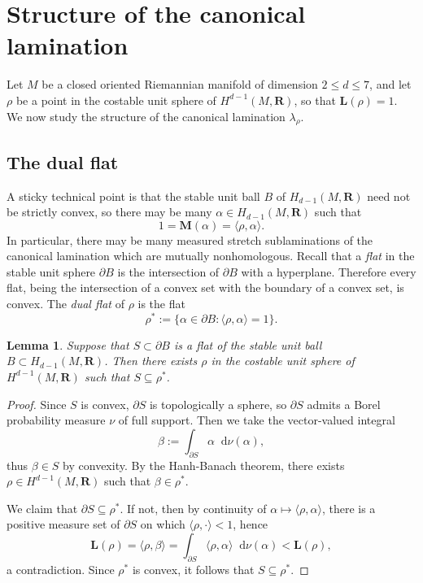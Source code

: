 \documentclass[reqno,11pt]{amsart}
\newcommand{\RR}{\mathbf{R}}
\newcommand*\dif{\mathop{}\!\mathrm{d}}
\newcommand{\Mass}{\mathbf M}
\newcommand{\Comass}{\mathbf L}
\newcommand{\dfn}[1]{\emph{#1}\index{#1}}
\newtheorem{lemma}[theorem]{Lemma}
\theoremstyle{definition}
\numberwithin{equation}{section}
\begin{document}
\section{Structure of the canonical lamination}\label{canonical structure}
Let $M$ be a closed oriented Riemannian manifold of dimension $2 \leq d \leq 7$, and let $\rho$ be a point in the costable unit sphere of $H^{d - 1}(M, \RR)$, so that $\Comass(\rho) = 1$.
We now study the structure of the canonical lamination $\lambda_\rho$.

\subsection{The dual flat}
A sticky technical point is that the stable unit ball $B$ of $H_{d - 1}(M, \RR)$ need not be strictly convex, so there may be many $\alpha \in H_{d - 1}(M, \RR)$ such that
\begin{equation}\label{flats duality}
1 = \Mass(\alpha) = \langle \rho, \alpha\rangle.
\end{equation}
In particular, there may be many measured stretch sublaminations of the canonical lamination which are mutually nonhomologous.
Recall that a \dfn{flat} in the stable unit sphere $\partial B$ is the intersection of $\partial B$ with a hyperplane.
Therefore every flat, being the intersection of a convex set with the boundary of a convex set, is convex.
The \dfn{dual flat} of $\rho$ is the flat
$$\rho^* := \{\alpha \in \partial B: \langle \rho, \alpha\rangle = 1\}.$$

\begin{lemma} \label{flats have dual classes}
Suppose that $S \subset \partial B$ is a flat of the stable unit ball $B \subset H_{d - 1}(M, \RR)$.
Then there exists $\rho$ in the costable unit sphere of $H^{d - 1}(M, \RR)$ such that $S \subseteq \rho^*$.
\end{lemma}
\begin{proof}
Since $S$ is convex, $\partial S$ is topologically a sphere, so $\partial S$ admits a Borel probability measure $\nu$ of full support.
Then we take the vector-valued integral 
$$\beta := \int_{\partial S} \alpha \dif \nu(\alpha),$$
thus $\beta \in S$ by convexity.
By the Hanh-Banach theorem, there exists $\rho \in H^{d - 1}(M, \RR)$ such that $\beta \in \rho^*$.

We claim that $\partial S \subseteq \rho^*$.
If not, then by continuity of $\alpha \mapsto \langle \rho, \alpha\rangle$, there is a positive measure set of $\partial S$ on which $\langle \rho, \cdot\rangle < 1$, hence
$$\Comass(\rho) = \langle \rho, \beta\rangle = \int_{\partial S} \langle \rho, \alpha\rangle \dif \nu(\alpha) < \Comass(\rho),$$
a contradiction.
Since $\rho^*$ is convex, it follows that $S \subseteq \rho^*$.
\end{proof}
\end{document}
